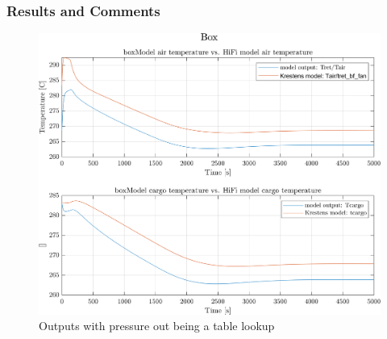 \subsubsection*{Results and Comments}
\begin{figure}[h]
	\centering
	\includegraphics[width=1\textwidth]{Graphics/comp_test_box.png}
	\caption{Outputs with pressure out being a table lookup}
	\label{fig:component_test_box}
\end{figure}


